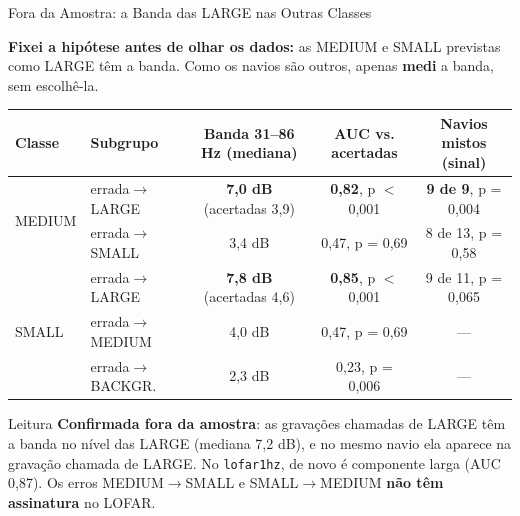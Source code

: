 \documentclass[aspectratio=169]{beamer}
\begin{document}
\begin{frame}{Fora da Amostra: a Banda das LARGE nas Outras Classes}
    \footnotesize
    {\scriptsize\textbf{Fixei a hipótese antes de olhar os dados:} as MEDIUM e SMALL previstas como LARGE têm a banda. Como os navios são outros, apenas \textbf{medi} a banda, sem escolhê-la.\par}
    \vspace{0.1cm}
    \begin{table}
    \centering
    \scriptsize
    \begin{tabular}{llccc}
    \toprule
    Classe & Subgrupo & Banda 31--86 Hz (mediana) & AUC vs. acertadas & Navios mistos (sinal) \\
    \midrule
    \multirow{2}{*}{MEDIUM} & errada$\to$LARGE & \textbf{7,0 dB} (acertadas 3,9) & \textbf{0,82}, p $<$ 0,001 & \textbf{9 de 9}, p = 0,004 \\
     & errada$\to$SMALL & 3,4 dB & 0,47, p = 0,69 & 8 de 13, p = 0,58 \\
    \midrule
    \multirow{3}{*}{SMALL} & errada$\to$LARGE & \textbf{7,8 dB} (acertadas 4,6) & \textbf{0,85}, p $<$ 0,001 & 9 de 11, p = 0,065 \\
     & errada$\to$MEDIUM & 4,0 dB & 0,47, p = 0,69 & --- \\
     & errada$\to$BACKGR. & 2,3 dB & 0,23, p = 0,006 & --- \\
    \bottomrule
    \end{tabular}
    \end{table}
    \vspace{0.05cm}
    \begin{alertblock}{Leitura}
        \scriptsize
        \textbf{Confirmada fora da amostra}: as gravações chamadas de LARGE têm a banda no nível das LARGE (mediana 7,2 dB), e no mesmo navio ela aparece na gravação chamada de LARGE. No \texttt{lofar1hz}, de novo é componente larga (AUC 0,87). Os erros MEDIUM$\to$SMALL e SMALL$\to$MEDIUM \textbf{não têm assinatura} no LOFAR.
    \end{alertblock}
\end{frame}
\end{document}
